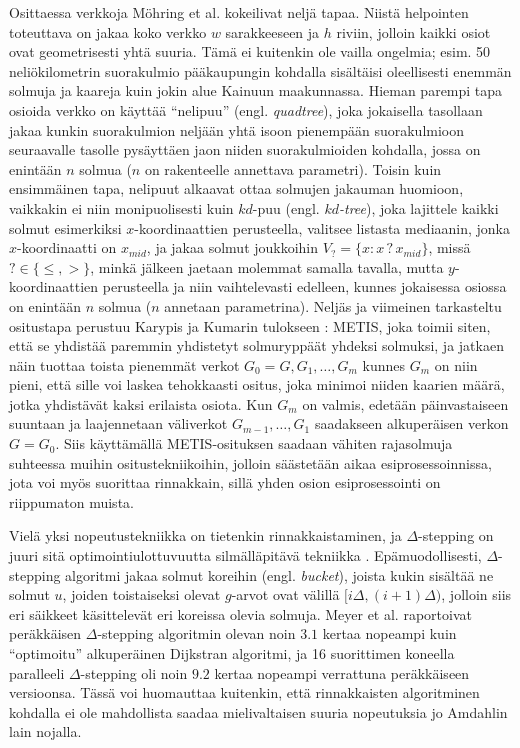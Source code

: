 \documentclass[12pt]{article}
\begin{document}
Osittaessa verkkoja Möhring et al. kokeilivat neljä tapaa. Niistä helpointen toteuttava on jakaa koko verkko $w$ sarakkeeseen ja $h$ riviin, jolloin kaikki osiot ovat geometrisesti yhtä suuria. Tämä ei kuitenkin ole vailla ongelmia; esim. 50 neliökilometrin suorakulmio pääkaupungin kohdalla sisältäisi oleellisesti enemmän solmuja ja kaareja kuin jokin alue Kainuun maakunnassa. Hieman parempi tapa osioida verkko on käyttää ``nelipuu'' (engl. \textit{quadtree}), joka jokaisella tasollaan jakaa kunkin suorakulmion neljään yhtä isoon pienempään suorakulmioon seuraavalle tasolle pysäyttäen jaon niiden suorakulmioiden kohdalla, jossa on enintään $n$ solmua ($n$ on rakenteelle annettava parametri). Toisin kuin ensimmäinen tapa, nelipuut alkaavat ottaa solmujen jakauman huomioon, vaikkakin ei niin monipuolisesti kuin $kd$-puu (engl. \textit{$kd$-tree}), joka lajittele kaikki solmut esimerkiksi $x$-koordinaattien perusteella, valitsee listasta mediaanin, jonka $x$-koordinaatti on $x_{mid}$, ja jakaa solmut joukkoihin $V_? = \{ x \colon x \, ? \, x_{mid} \}$, missä $? \in \{ \leq, >\}$, minkä jälkeen jaetaan molemmat samalla tavalla, mutta $y$-koordinaattien perusteella ja niin vaihtelevasti edelleen, kunnes jokaisessa osiossa on enintään $n$ solmua ($n$ annetaan parametrina). Neljäs ja viimeinen tarkasteltu ositustapa perustuu Karypis ja Kumarin tulokseen \cite{Karypis98}: METIS, joka toimii siten, että se yhdistää paremmin yhdistetyt solmuryppäät yhdeksi solmuksi, ja jatkaen näin tuottaa toista pienemmät verkot $G_0 = G, G_1, \dots, G_m$ kunnes $G_m$ on niin pieni, että sille voi laskea tehokkaasti ositus, joka minimoi niiden kaarien määrä, jotka yhdistävät kaksi erilaista osiota. Kun $G_m$ on valmis, edetään päinvastaiseen suuntaan ja laajennetaan väliverkot $G_{m - 1}, \dots, G_1$ saadakseen alkuperäisen verkon $G = G_0$. Siis käyttämällä METIS-osituksen saadaan vähiten rajasolmuja suhteessa muihin ositustekniikoihin, jolloin säästetään aikaa esiprosessoinnissa, jota voi myös suorittaa rinnakkain, sillä yhden osion esiprosessointi on riippumaton muista.

Vielä yksi nopeutustekniikka on tietenkin rinnakkaistaminen, ja $\Delta$-stepping on juuri sitä optimointiulottuvuutta silmälläpitävä tekniikka \cite{Meyer98}. Epämuodollisesti, $\Delta$-stepping algoritmi jakaa solmut koreihin (engl. \textit{bucket}), joista kukin sisältää ne solmut $u$, joiden toistaiseksi olevat $g$-arvot ovat välillä $[i\Delta, (i +1)\Delta)$, jolloin siis eri säikkeet käsittelevät eri koreissa olevia solmuja. Meyer et al. raportoivat peräkkäisen $\Delta$-stepping algoritmin olevan noin $3.1$ kertaa nopeampi kuin ``optimoitu'' alkuperäinen Dijkstran algoritmi, ja 16 suorittimen koneella paralleeli $\Delta$-stepping oli noin $9.2$ kertaa nopeampi verrattuna peräkkäiseen versioonsa. Tässä voi huomauttaa kuitenkin, että rinnakkaisten algoritminen kohdalla ei ole mahdollista saadaa mielivaltaisen suuria nopeutuksia jo Amdahlin lain nojalla.


\end{document}

